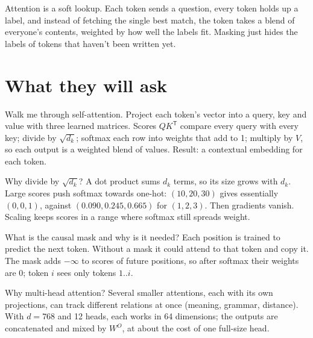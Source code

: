 \begin{intuition}
Attention is a soft lookup. Each token sends a question, every token holds up a label, and instead of fetching the single best match, the token takes a blend of everyone's contents, weighted by how well the labels fit. Masking just hides the labels of tokens that haven't been written yet.
\end{intuition}

\section{What they will ask}

\begin{iq}[\core]{Walk me through self-attention.}
Project each token's vector into a query, key and value with three learned matrices. Scores $QK^{\mathsf T}$ compare every query with every key; divide by $\sqrt{d_k}$; softmax each row into weights that add to 1; multiply by $V$, so each output is a weighted blend of values. Result: a contextual embedding for each token.
\end{iq}

\begin{iq}[\core]{Why divide by $\sqrt{d_k}$?}
A dot product sums $d_k$ terms, so its size grows with $d_k$. Large scores push softmax towards one-hot: $(10, 20, 30)$ gives essentially $(0, 0, 1)$, against $(0.090, 0.245, 0.665)$ for $(1, 2, 3)$. Then gradients vanish. Scaling keeps scores in a range where softmax still spreads weight.
\end{iq}

\begin{iq}[\core]{What is the causal mask and why is it needed?}
Each position is trained to predict the next token. Without a mask it could attend to that token and copy it. The mask adds $-\infty$ to scores of future positions, so after softmax their weights are 0; token $i$ sees only tokens $1..i$.
\end{iq}

\begin{iq}[\core]{Why multi-head attention?}
Several smaller attentions, each with its own projections, can track different relations at once (meaning, grammar, distance). With $d = 768$ and 12 heads, each works in 64 dimensions; the outputs are concatenated and mixed by $W^O$, at about the cost of one full-size head.
\end{iq}

